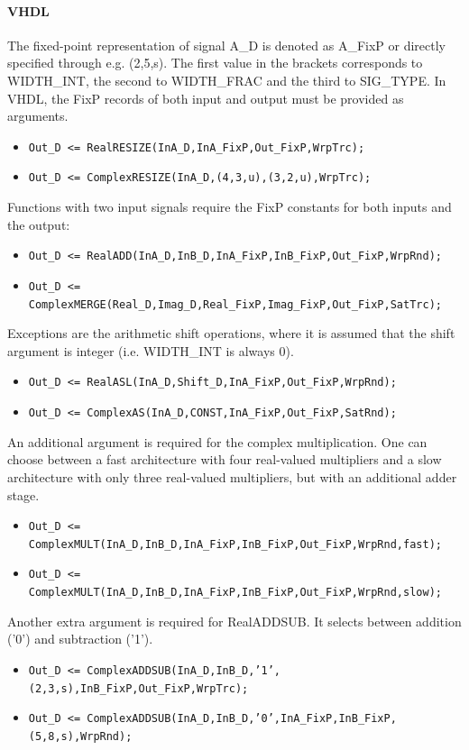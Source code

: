 \documentclass[a4paper,11pt]{article}
\begin{document}
\paragraph{VHDL} The fixed-point representation of signal A\_D is
denoted as A\_FixP or directly specified through e.g. (2,5,s).  The
first value in the brackets corresponds to WIDTH\_INT, the second to
WIDTH\_FRAC and the third to SIG\_TYPE. In VHDL, the FixP records of
both input and output must be provided as arguments.
\begin{itemize}
\item \texttt{Out\_D <=
    RealRESIZE(InA\_D,InA\_FixP,Out\_FixP,WrpTrc);}
\item \texttt{Out\_D <= ComplexRESIZE(InA\_D,(4,3,u),(3,2,u),WrpTrc);}
\end{itemize}
Functions with two input signals require the FixP constants for both
inputs and the output:
\begin{itemize}
\item \texttt{Out\_D <=
    RealADD(InA\_D,InB\_D,InA\_FixP,InB\_FixP,Out\_FixP,WrpRnd);}
\item \texttt{Out\_D <=
    ComplexMERGE(Real\_D,Imag\_D,Real\_FixP,Imag\_FixP,Out\_FixP,SatTrc);}
\end{itemize}
Exceptions are the arithmetic shift operations, where it is assumed
that the shift argument is integer (i.e. WIDTH\_INT is always 0).
\begin{itemize}
\item \texttt{Out\_D <=
    RealASL(InA\_D,Shift\_D,InA\_FixP,Out\_FixP,WrpRnd);}
\item \texttt{Out\_D <=
    ComplexAS(InA\_D,CONST,InA\_FixP,Out\_FixP,SatRnd);}
\end{itemize}
An additional argument is required for the complex multiplication. One
can choose between a fast architecture with four real-valued
multipliers and a slow architecture with only three real-valued
multipliers, but with an additional adder stage.
\begin{itemize}
\item \texttt{Out\_D <=
    ComplexMULT(InA\_D,InB\_D,InA\_FixP,InB\_FixP,Out\_FixP,WrpRnd,fast);}
\item \texttt{Out\_D <=
    ComplexMULT(InA\_D,InB\_D,InA\_FixP,InB\_FixP,Out\_FixP,WrpRnd,slow);}
\end{itemize}
Another extra argument is required for RealADDSUB. It selects between
addition ('0') and subtraction ('1').
\begin{itemize}
\item \texttt{Out\_D <=
    ComplexADDSUB(InA\_D,InB\_D,'1',(2,3,s),InB\_FixP,Out\_FixP,WrpTrc);}
\item \texttt{Out\_D <=
    ComplexADDSUB(InA\_D,InB\_D,'0',InA\_FixP,InB\_FixP,(5,8,s),WrpRnd);}
\end{itemize}
\end{document}

